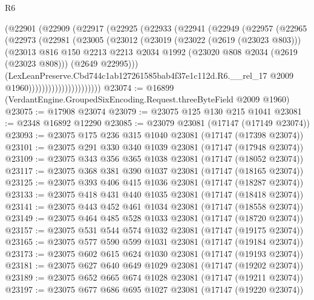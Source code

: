 \begin{lexlean}{R6}
\begin{coremodule}
                    (@22901
                      (@22909
                        (@22917
                          (@22925
                            (@22933
                              (@22941
                                (@22949
                                  (@22957
                                    (@22965
                                      (@22973
                                        (@22981
                                          (@23005
                                            (@23012
                                              (@23019
                                                (@23022 (@2619 (@23023 @803)))
                                                (@23013
                                                  @816
                                                  @150
                                                  @2213
                                                  @2213
                                                  @2034
                                                  @1992
                                                  (@23020 @808 @2034 (@2619 (@23023 @808)))
                                                  (@2649 @22995)))
                                              (LexLeanPreserve.Cbd744c1ab127261585bab4f37e1c112d.R6.__rel_17
                                                @2009
                                                @1960))))))))))))))))))))))
@23074 := @16899 (VerdantEngine.GroupedSixEncoding.Request.threeByteField @2009 @1960)
@23075 := @17908 @23074
@23079 := @23075 @125 @130 @215 @1041
@23081 := @2348 @16892 @12290
@23085 := @23079 @23081 (@17147 (@17149 @23074))
@23093 := @23075 @175 @236 @315 @1040 @23081 (@17147 (@17398 @23074))
@23101 := @23075 @291 @330 @340 @1039 @23081 (@17147 (@17948 @23074))
@23109 := @23075 @343 @356 @365 @1038 @23081 (@17147 (@18052 @23074))
@23117 := @23075 @368 @381 @390 @1037 @23081 (@17147 (@18165 @23074))
@23125 := @23075 @393 @406 @415 @1036 @23081 (@17147 (@18287 @23074))
@23133 := @23075 @418 @431 @440 @1035 @23081 (@17147 (@18418 @23074))
@23141 := @23075 @443 @452 @461 @1034 @23081 (@17147 (@18558 @23074))
@23149 := @23075 @464 @485 @528 @1033 @23081 (@17147 (@18720 @23074))
@23157 := @23075 @531 @544 @574 @1032 @23081 (@17147 (@19175 @23074))
@23165 := @23075 @577 @590 @599 @1031 @23081 (@17147 (@19184 @23074))
@23173 := @23075 @602 @615 @624 @1030 @23081 (@17147 (@19193 @23074))
@23181 := @23075 @627 @640 @649 @1029 @23081 (@17147 (@19202 @23074))
@23189 := @23075 @652 @665 @674 @1028 @23081 (@17147 (@19211 @23074))
@23197 := @23075 @677 @686 @695 @1027 @23081 (@17147 (@19220 @23074))

\end{coremodule}
\end{lexlean}
